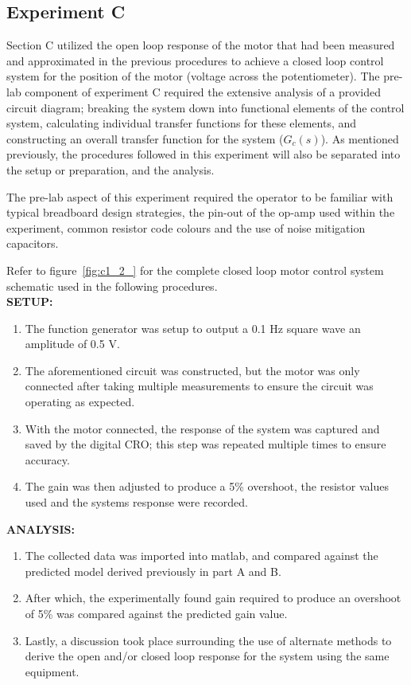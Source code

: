 \documentclass[11pt,a4paper]{article}
\begin{document}
\pagebreak
\subsection{Experiment C}
Section C utilized the open loop response of the motor that had been measured and approximated in the previous procedures to achieve a closed loop control system for the position of the motor (voltage across the potentiometer). The pre-lab component of experiment C required the extensive analysis of a provided circuit diagram; breaking the system down into functional elements of the control system, calculating individual transfer functions for these elements, and constructing an overall transfer function for the system ($G_c(s)$). As mentioned previously, the procedures followed in this experiment will also be separated into the setup or preparation, and the analysis. 

The pre-lab aspect of this experiment required the operator to be familiar with typical breadboard design strategies, the pin-out of the op-amp used within the experiment, common resistor code colours and the use of noise mitigation capacitors. 

Refer to figure~\ref{fig:c1_2_} for the complete closed loop motor control system schematic used in the following procedures.\\

\textbf{SETUP:}
\begin{enumerate}
	\item The function generator was setup to output a 0.1 Hz square wave an amplitude of 0.5 V.
	\item The aforementioned circuit was constructed, but the motor was only connected after taking multiple measurements to ensure the circuit was operating as expected. 
	\item With the motor connected, the response of the system was captured and saved by the digital CRO; this step was repeated multiple times to ensure accuracy.
	\item The gain was then adjusted to produce a 5\% overshoot, the resistor values used and the systems response were recorded.
\end{enumerate} 

\textbf{ANALYSIS:}
\begin{enumerate}
	\item The collected data was imported into matlab, and compared against the predicted model derived previously in part A and B.
	\item After which, the experimentally found gain required to produce an overshoot of 5\% was compared against the predicted gain value. 
	\item Lastly, a discussion took place surrounding the use of alternate methods to derive the open and/or closed loop response for the system using the same equipment.
\end{enumerate}
\end{document}
